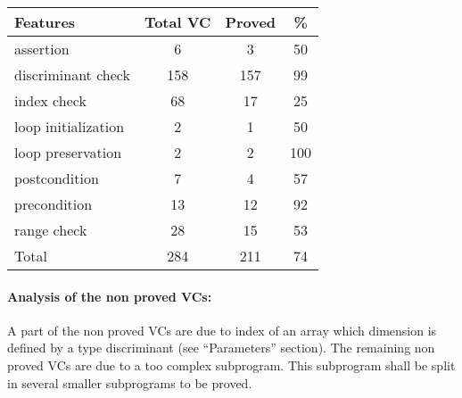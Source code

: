 \documentclass[10pt,a4paper,twocolumn]{article}
\begin{document}
\begin{tabular}{|l|c|c|c|}
\hline
Features            & Total VC & Proved & \%  \\ %
\hline
assertion           & 6        & 3      & 50  \\ %
\hline
discriminant check  & 158      & 157    & 99  \\ %
\hline
index check         & 68       & 17     & 25  \\ %
\hline
loop initialization & 2        & 1      & 50  \\ %
\hline
loop  preservation  & 2        & 2      & 100 \\ %
\hline
postcondition       & 7        & 4      & 57  \\ %
\hline
precondition        & 13       & 12     & 92  \\ %
\hline
range check         & 28       & 15     & 53  \\ %
\hline
Total               & 284      & 211    & 74  \\ %
\hline
\end{tabular}


\paragraph{Analysis of the non proved VCs:}
A part of the non proved VCs are due to index of an array which dimension is defined by a type discriminant (see ``Parameters'' section).
The remaining non proved VCs are due to a too complex subprogram.
This subprogram shall be split in several smaller subprograms to be proved.
\end{document}
